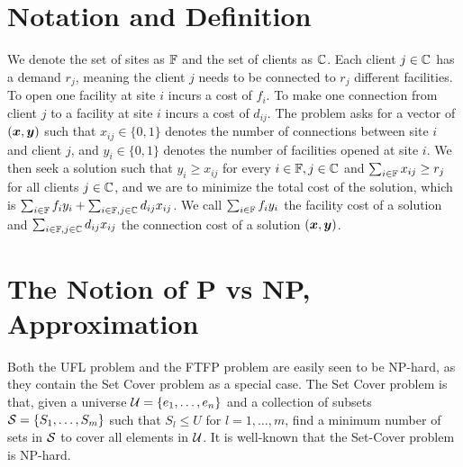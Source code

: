 \documentclass[oneside,final]{ucr}
\begin{document}
\section{Notation and Definition}
We denote the set of sites as $\mathbb{F}$ and the set of clients as
$\mathbb{C}$. Each client $j \in \mathbb{C}$ has a demand $r_j$,
meaning the client $j$ needs to be connected to $r_j$ different
facilities. To open one facility at site $i$ incurs a cost of
$f_i$. To make one connection from client $j$ to a facility at site
$i$ incurs a cost of $d_{ij}$. The problem asks for a vector of
$(\boldsymbol{x}, \boldsymbol{y})$ such that $x_{ij} \in \{0, 1\}$ denotes the number of
connections between site $i$ and client $j$, and $y_i \in \{0, 1\}$
denotes the number of facilities opened at site $i$. We then seek a
solution such that $y_i \geq x_{ij}$ for every $i \in \mathbb{F}, j \in
\mathbb{C}$ and $\sum_{i\in\mathbb{F}} x_{ij} \geq r_j$ for all clients
$j \in \mathbb{C}$, and we are to minimize the total cost of the
solution, which is $\sum_{i \in \mathbb{F}} f_i y_i + \sum_{i \in
  \mathbb{F}, j \in \mathbb{C}} d_{ij} x_{ij}$. We call $\sum_{i \in
  \mathbb{F}} f_i y_i$ the facility cost of a solution and $\sum_{i \in
  \mathbb{F}, j \in \mathbb{C}} d_{ij} x_{ij}$ the connection cost of a
solution $(\boldsymbol{x}, \boldsymbol{y})$.

\section{The Notion of P vs NP, Approximation}
Both the UFL problem and the FTFP problem are easily seen to be
NP-hard, as they contain the Set Cover problem as a special case. The
Set Cover problem is that, given a universe $\calU = \{e_1,
\ldots, e_n\}$ and a collection of subsets $\calS = \{S_1,
\ldots, S_m\}$ such that $S_l \leq U$ for $l=1,\ldots,m$, find a
minimum number of sets in $\calS$ to cover all elements in
$\calU$. It is well-known that the Set-Cover problem is NP-hard.
\end{document}

